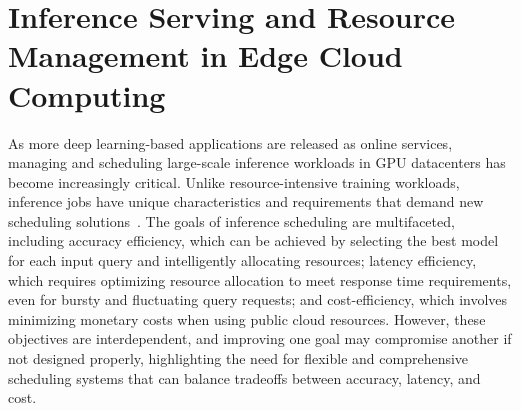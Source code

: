 
\section{Inference Serving and Resource Management in Edge Cloud Computing}



As more deep learning-based applications are released as online services, managing and scheduling large-scale inference workloads in GPU datacenters has become increasingly critical. Unlike resource-intensive training workloads, inference jobs have unique characteristics and requirements that demand new scheduling solutions~. The goals of inference scheduling are multifaceted, including accuracy efficiency, which can be achieved by selecting the best model for each input query and intelligently allocating resources; latency efficiency, which requires optimizing resource allocation to meet response time requirements, even for bursty and fluctuating query requests; and cost-efficiency, which involves minimizing monetary costs when using public cloud resources. However, these objectives are interdependent, and improving one goal may compromise another if not designed properly, highlighting the need for flexible and comprehensive scheduling systems that can balance tradeoffs between accuracy, latency, and cost.

